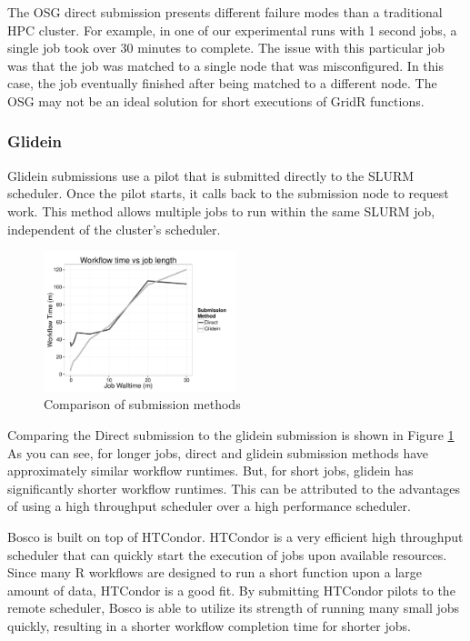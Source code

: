 \documentclass[conference]{IEEEtran}
\begin{document}
The OSG direct submission presents different failure modes than a traditional HPC cluster.  For example, in one of our experimental runs with 1 second jobs, a single job took over 30 minutes to complete.  The issue with this particular job was that the job was matched to a single node that was misconfigured.  In this case, the job eventually finished after being matched to a different node.  The OSG may not be an ideal solution for short executions of GridR functions.

\subsubsection{Glidein}
Glidein submissions use a pilot that is submitted directly to the SLURM scheduler.  Once the pilot starts, it calls back to the submission node to request work.  This method allows multiple jobs to run within the same SLURM job, independent of the cluster's scheduler.  

\begin{figure}[ht!]
\centering
\includegraphics[width=0.5\textwidth]{images/ComparisonPlot.pdf}
\caption{Comparison of submission methods}
\label{fig:comparesubmit}
\end{figure}

Comparing the Direct submission to the glidein submission is shown in Figure \ref{fig:comparesubmit}  As you can see, for longer jobs, direct and glidein submission methods have approximately similar workflow runtimes.  But, for short jobs, glidein has significantly shorter workflow runtimes.  This can be attributed to the advantages of using a high throughput scheduler over a high performance scheduler.

Bosco is built on top of HTCondor.  HTCondor is a very efficient high throughput scheduler that can quickly start the execution of jobs upon available resources.  Since many R workflows are designed to run a short function upon a large amount of data, HTCondor is a good fit.  By submitting HTCondor pilots to the remote scheduler, Bosco is able to utilize its strength of running many small jobs quickly, resulting in a shorter workflow completion time for shorter jobs.
\end{document}
